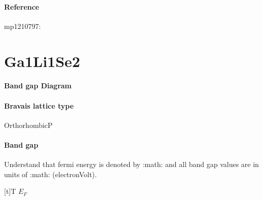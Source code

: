 \documentclass[letterpaper,10pt,english]{sphinxmanual}
\begin{document}
\subsubsection*{Reference}

\sphinxAtStartPar
mp\sphinxhyphen{}1210797: 

\sphinxstepscope


\chapter{Ga1Li1Se2}
\label{\detokenize{Ga1Li1Se2/Ga1Li1Se2:ga1li1se2}}\label{\detokenize{Ga1Li1Se2/Ga1Li1Se2::doc}}\subsubsection*{Band gap Diagram}

\noindent{}
\subsubsection*{Bravais lattice type}

\sphinxAtStartPar
OrthorhombicP
\subsubsection*{Band gap}

\sphinxAtStartPar
Understand that fermi energy is denoted by :math: and all band gap values are in units of :math: (electron\sphinxhyphen{}Volt).


\begin{savenotes}\sphinxattablestart
\sphinxthistablewithglobalstyle
\centering
\begin{tabulary}{\linewidth}[t]{T}
\sphinxtoprule
\sphinxstyletheadfamily 
\sphinxAtStartPar
\(E_F\)
\\
\sphinxmidrule
\sphinxtableatstartofbodyhook
{}
\\
\sphinxbottomrule
\end{tabulary}
\sphinxtableafterendhook\par
\sphinxattableend\end{savenotes}
\end{document}
